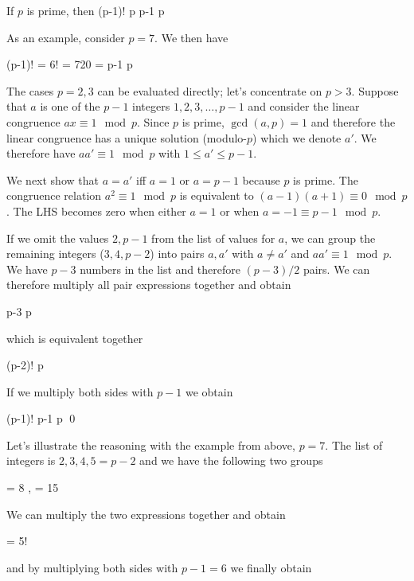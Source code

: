 
\begin{theorem}
    If $p$ is prime, then
    \bee
    (p-1)!  \mod p \equiv p-1 \mod p
    \eee
\end{theorem}

As an example, consider $p = 7$. We then have

\bee
(p-1)! = 6! = 720  = p-1 \mod p
\eee

The cases $p =2, 3$ can be evaluated directly; let's concentrate on $p > 3$. Suppose that $a$ is one of the $p-1$ integers $1,2,3,\ldots, p-1$ and consider the linear congruence $ax \equiv 1 \mod p$. Since $p$ is prime, $\gcd(a,p) = 1$ and therefore the linear congruence has a unique solution (modulo-$p$) which we denote $a'$. We therefore have $a a' \equiv 1 \mod p$ with $1 \leq a' \leq p-1$.

We next show that $a = a'$ iff $a = 1$ or $a = p-1$ because $p$ is prime. The congruence relation $a^2 \equiv 1 \mod p$ is equivalent to $(a-1)(a+1) \equiv 0 \mod p$. The LHS becomes zero when either $a = 1$ or when $a = -1 \equiv p-1 \mod p$.

If we omit the values $2, p-1$ from the list of values for $a$, we can group the remaining integers ($3,4, p-2$) into pairs $a, a'$ with $a \neq a'$ and $a a' \equiv 1 \mod p$. We have $p-3$ numbers in the list and therefore $(p-3)/2$ pairs. We can therefore multiply all pair expressions together and obtain

  \cdots p-3  \mod p
\eee

which is equivalent together

\bee
(p-2)!  \mod p
\eee

If we multiply both sides with $p-1$ we obtain

\bee
(p-1)! \equiv p-1  \mod p \qed
\eee

Let's illustrate the reasoning with the example from above, $p=7$. The list of integers is $2,3,4,5 = p-2$ and we have the following two groups

  = 8  ,   = 15  
\eee

We can multiply the two expressions together and obtain

    = 5!  
\eee

and by multiplying both sides with $p-1=6$ we finally obtain

